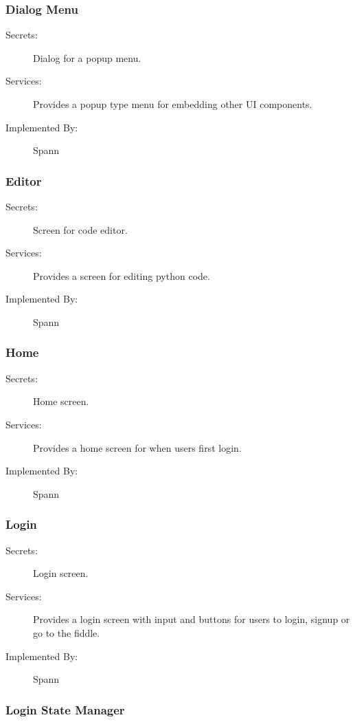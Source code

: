 \documentclass[12pt, titlepage]{article}
\begin{document}
\subsubsection{Dialog Menu}

\begin{description}
\item[Secrets:] Dialog for a popup menu.
\item[Services:] Provides a popup type menu for embedding other UI components.
\item[Implemented By:] Spann
\end{description}

\subsubsection{Editor}

\begin{description}
\item[Secrets:] Screen for code editor.
\item[Services:] Provides a screen for editing python code.
\item[Implemented By:] Spann
\end{description}

\subsubsection{Home}

\begin{description}
\item[Secrets:] Home screen.
\item[Services:] Provides a home screen for when users first login.
\item[Implemented By:] Spann
\end{description}

\subsubsection{Login}

\begin{description}
\item[Secrets:] Login screen.
\item[Services:] Provides a login screen with input and buttons for users to login,
    signup or go to the fiddle.
\item[Implemented By:] Spann
\end{description}

\subsubsection{Login State Manager}
\end{document}
